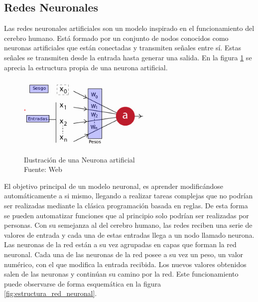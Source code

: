 \subsection{Redes Neuronales}
Las redes neuronales artificiales son un modelo inspirado en el funcionamiento del cerebro humano. Está formado por un conjunto de nodos conocidos como neuronas artificiales que están conectadas y transmiten señales entre sí. Estas señales se transmiten desde la entrada hasta generar una salida. En la figura \ref{fig:classical_ml} se aprecia la estructura propia de una neurona artificial.\\

\begin{figure}[H]
    \begin{center}
        \includegraphics[width=7cm]{img/capitulo_2/neurona.png}
    \end{center}
    \caption{Ilustración de una Neurona artificial
        \\Fuente: Web}
    \label{fig:classical_ml}
\end{figure}

El objetivo principal de un modelo neuronal, es aprender modificándose automáticamente a si mismo, llegando a realizar tareas complejas que no podrían ser realizadas mediante la clásica programación basada en reglas. De esta forma se pueden automatizar funciones que al principio solo podrían ser realizadas por personas. Con su semejanza al del cerebro humano, las redes reciben una serie de valores de entrada y cada una de estas entradas llega a un nodo llamado neurona.\\

Las neuronas de la red están a su vez agrupadas en capas que forman la red neuronal. Cada una de las neuronas de la red posee a su vez un peso, un valor numérico, con el que modifica la entrada recibida. Los nuevos valores obtenidos salen de las neuronas y continúan su camino por la red. Este funcionamiento puede observarse de forma esquemática en la figura \ref{fig:estructura_red_neuronal}.\\

